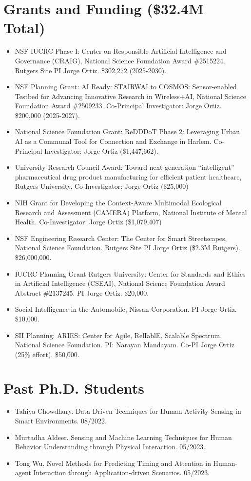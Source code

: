 \documentclass[12pt]{article}
\begin{document}
\section{Grants and Funding (\$32.4M Total)}
\begin{itemize}
    \item NSF IUCRC Phase I: Center on Responsible Artificial Intelligence and Governance (CRAIG), National Science Foundation Award \#2515224. Rutgers Site PI Jorge Ortiz. \$302,272 (2025-2030).
    \item NSF Planning Grant: AI Ready: STAIRWAI to COSMOS: Sensor-enabled Testbed for Advancing Innovative Research in Wireless+AI, National Science Foundation Award \#2509233. Co-Principal Investigator: Jorge Ortiz. \$200,000 (2025-2027).
    \item National Science Foundation Grant: ReDDDoT Phase 2: Leveraging Urban AI as a Communal Tool for Connection and Exchange in Harlem. Co-Principal Investigator: Jorge Ortiz (\$1,447,662).
    \item University Research Council Award: Toward next-generation ``intelligent'' pharmaceutical drug product manufacturing for efficient patient healthcare, Rutgers University. Co-Investigator: Jorge Ortiz (\$25,000)
    \item NIH Grant for Developing the Context-Aware Multimodal Ecological Research and Assessment (CAMERA) Platform, National Institute of Mental Health. Co-Investigator: Jorge Ortiz (\$1,079,407)
    \item NSF Engineering Research Center: The Center for Smart Streetscapes, National Science Foundation. Rutgers Site PI Jorge Ortiz (\$2.3M Rutgers). \$26,000,000.
    \item IUCRC Planning Grant Rutgers University: Center for Standards and Ethics in Artificial Intelligence (CSEAI), National Science Foundation Award Abstract \#2137245. PI Jorge Ortiz. \$20,000.
    \item Social Intelligence in the Automobile, Nissan Corporation. PI Jorge Ortiz. \$10,000.
    \item SII Planning: ARIES: Center for Agile, RelIablE, Scalable Spectrum, National Science Foundation. PI: Narayan Mandayam. Co-PI Jorge Ortiz (25\% effort). \$50,000.
\end{itemize}




\section{Past Ph.D. Students}
\begin{itemize}
    \item Tahiya Chowdhury. Data-Driven Techniques for Human Activity Sensing in Smart Environments. 08/2022.
    \item Murtadha Aldeer. Sensing and Machine Learning Techniques for Human Behavior Understanding through Physical Interaction. 05/2023.
    \item Tong Wu. Novel Methods for Predicting Timing and Attention in Human-agent Interaction through Application-driven Scenarios. 05/2023.
\end{itemize}
\end{document}

